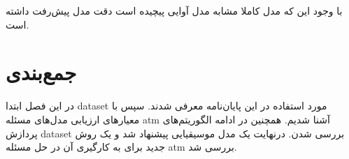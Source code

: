 با وجود این که مدل کاملا مشابه مدل آوایی پیچیده است دقت مدل پیش‌رفت داشته است.

\section{جمع‌بندی}
در این فصل ابتدا \gls{dataset} مورد استفاده در این پایان‌نامه معرفی شدند. سپس با
معیارهای ارزیابی مدل‌های مسئله \gls{atm} آشنا شدیم. همچنین در ادامه الگوریتم‌های
پردازش \gls{dataset} بررسی شدن. درنهایت یک مدل موسیقیایی پیشنهاد شد و یک روش
جدید برای به کارگیری آن در حل مسئله \gls{atm} بررسی شد.